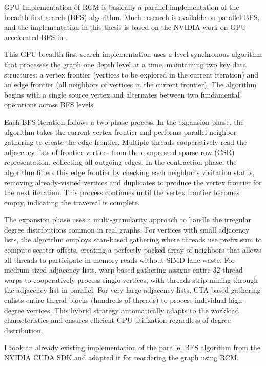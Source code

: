 GPU Implementation of RCM is basically a parallel implementation of the breadth-first search (BFS) algorithm. Much research is available on parallel BFS, and the implementation in this thesis is based on the NVIDIA work on GPU-accelerated BFS in \cite{merrill_scalable_nodate}.

This GPU breadth-first search implementation uses a level-synchronous algorithm that processes the graph one depth level at a time, maintaining two key data structures: a vertex frontier (vertices to be explored in the current iteration) and an edge frontier (all neighbors of vertices in the current frontier). The algorithm begins with a single source vertex and alternates between two fundamental operations across BFS levels.

Each BFS iteration follows a two-phase process. In the expansion phase, the algorithm takes the current vertex frontier and performs parallel neighbor gathering to create the edge frontier. Multiple threads cooperatively read the adjacency lists of frontier vertices from the compressed sparse row (CSR) representation, collecting all outgoing edges. In the contraction phase, the algorithm filters this edge frontier by checking each neighbor's visitation status, removing already-visited vertices and duplicates to produce the vertex frontier for the next iteration. This process continues until the vertex frontier becomes empty, indicating the traversal is complete.

The expansion phase uses a multi-granularity approach to handle the irregular degree distributions common in real graphs. For vertices with small adjacency lists, the algorithm employs scan-based gathering where threads use prefix sum to compute scatter offsets, creating a perfectly packed array of neighbors that allows all threads to participate in memory reads without SIMD lane waste. For medium-sized adjacency lists, warp-based gathering assigns entire 32-thread warps to cooperatively process single vertices, with threads strip-mining through the adjacency list in parallel. For very large adjacency lists, CTA-based gathering enlists entire thread blocks (hundreds of threads) to process individual high-degree vertices. This hybrid strategy automatically adapts to the workload characteristics and ensures efficient GPU utilization regardless of degree distribution.

I took an already existing implementation of the parallel BFS algorithm from the NVIDIA CUDA SDK \cite{kaleta_kaletapbfs-cuda-gpu_2025} and adapted it for reordering the graph using RCM.
